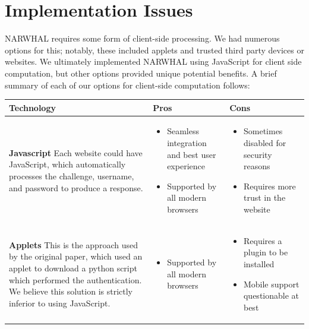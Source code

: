 \documentclass[11pt]{article}
\begin{document}
\section{Implementation Issues}
NARWHAL requires some form of client-side processing. We had numerous options for this; notably, these included applets and trusted third party devices or websites. We ultimately implemented NARWHAL using JavaScript for client side computation, but other options provided unique potential benefits. A brief summary of each of our options for client-side computation follows:

\small
\begin{center}
    \begin{tabular}{|  p{6cm} | p{5cm} | p{5cm} |}
    \hline
    Technology & Pros & Cons \\ \hline
    \vspace{.4cm}
    \textbf{Javascript}
    Each website could have JavaScript, which automatically processes the challenge, username, and password to produce a response. & 

    \begin{itemize}[leftmargin=*]
    \item  Seamless integration and best user experience

    \item  Supported by all modern browsers
    \end{itemize}
    &
    \begin{itemize}[leftmargin=*]
    \item Sometimes disabled for security reasons

    \item Requires more trust in the website
    \end{itemize}
    \\ \hline
    \vspace{.4cm}
    \textbf{Applets}
    This is the approach used by the original paper, which used an applet to download a python script which performed the authentication. We believe this solution is strictly inferior to using JavaScript.
    &
    \begin{itemize}[leftmargin=*]
    \item  Supported by all modern browsers
    \end{itemize}
    &
    \begin{itemize}[leftmargin=*]
    \item Requires a plugin to be installed

    \item Mobile support questionable at best
    \end{itemize}


\end{tabular}
\end{center}
\end{document}
